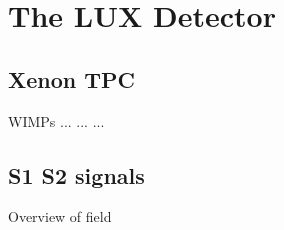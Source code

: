 

\renewcommand{\thechapter}{2}

\chapter{The LUX Detector}

\section{Xenon TPC}

	WIMPs ... ... ...

\section{S1 S2 signals}

Overview of field

